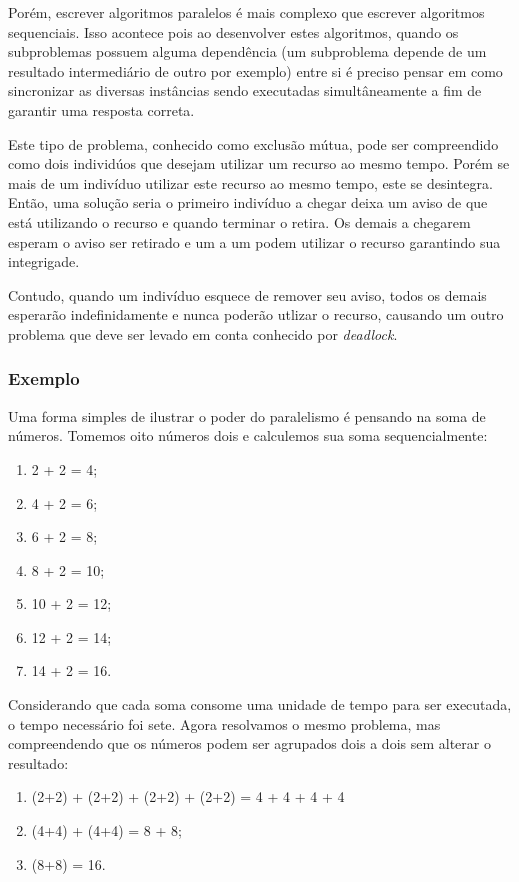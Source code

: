     Porém, escrever algoritmos paralelos é mais complexo que escrever algoritmos sequenciais. Isso acontece pois ao desenvolver estes algoritmos, quando os subproblemas possuem alguma dependência (um subproblema depende de um resultado intermediário de outro por exemplo) entre si é preciso pensar em como sincronizar as diversas instâncias sendo executadas simultâneamente a fim de garantir uma resposta correta.
    
    Este tipo de problema, conhecido como exclusão mútua, pode ser compreendido como dois individúos que desejam utilizar um recurso ao mesmo tempo. Porém se mais de um indivíduo utilizar este recurso ao mesmo tempo, este se desintegra. Então, uma solução seria o primeiro indivíduo a chegar deixa um aviso de que está utilizando o recurso e quando terminar o retira. Os demais a chegarem esperam o aviso ser retirado e um a um podem utilizar o recurso garantindo sua integrigade.
    
    Contudo, quando um indivíduo esquece de remover seu aviso, todos os demais esperarão indefinidamente e nunca poderão utlizar o recurso, causando um outro problema que deve ser levado em conta conhecido por \textit{deadlock}.
    
    \subsubsection{Exemplo}
    
    Uma forma simples de ilustrar o poder do paralelismo é pensando na soma de números. Tomemos oito números dois e calculemos sua soma sequencialmente:
    \begin{enumerate}
      \item 2 + 2 = 4;
      \item 4 + 2 = 6;
      \item 6 + 2 = 8;
      \item 8 + 2 = 10;
      \item 10 + 2 = 12;
      \item 12 + 2 = 14;
      \item 14 + 2 = 16.
    \end{enumerate}
    
    Considerando que cada soma consome uma unidade de tempo para ser executada, o tempo necessário foi sete. Agora resolvamos o mesmo problema, mas compreendendo que os números podem ser agrupados dois a dois sem alterar o resultado:
    \begin{enumerate}
      \item (2+2) + (2+2) + (2+2) + (2+2) = 4 + 4 + 4 + 4
      \item (4+4) + (4+4) = 8 + 8;
      \item (8+8) = 16.
    \end{enumerate}
    

